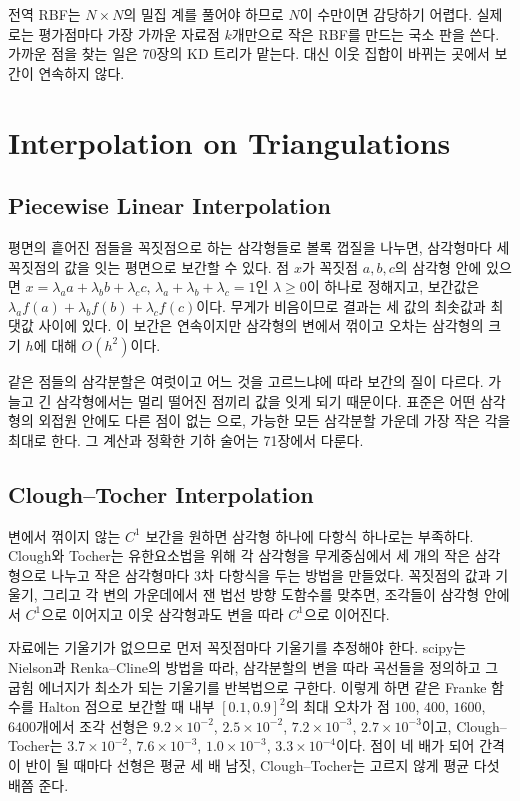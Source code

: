 전역 RBF는 $N\times N$의 밀집 계를 풀어야 하므로 $N$이 수만이면 감당하기 어렵다. 실제로는 평가점마다 가장 가까운 자료점 $k$개만으로 작은 RBF를 만드는 국소 판을 쓴다. 가까운 점을 찾는 일은 70장의 KD 트리가 맡는다. 대신 이웃 집합이 바뀌는 곳에서 보간이 연속하지 않다.

\section{Interpolation on Triangulations}
\label{sec:triangulation-interp}

\subsection{Piecewise Linear Interpolation}

평면의 흩어진 점들을 꼭짓점으로 하는 삼각형들로 볼록 껍질을 나누면, 삼각형마다 세 꼭짓점의 값을 잇는 평면으로 보간할 수 있다. 점 $x$가 꼭짓점 $a,b,c$의 삼각형 안에 있으면 $x=\lambda_aa+\lambda_bb+\lambda_cc$, $\lambda_a+\lambda_b+\lambda_c=1$인  $\lambda\ge0$이 하나로 정해지고, 보간값은 $\lambda_af(a)+\lambda_bf(b)+\lambda_cf(c)$이다. 무게가 비음이므로 결과는 세 값의 최솟값과 최댓값 사이에 있다. 이 보간은 연속이지만 삼각형의 변에서 꺾이고 오차는 삼각형의 크기 $h$에 대해 $O(h^2)$이다.

같은 점들의 삼각분할은 여럿이고 어느 것을 고르느냐에 따라 보간의 질이 다르다. 가늘고 긴 삼각형에서는 멀리 떨어진 점끼리 값을 잇게 되기 때문이다. 표준은 어떤 삼각형의 외접원 안에도 다른 점이 없는 으로, 가능한 모든 삼각분할 가운데 가장 작은 각을 최대로 한다\cite{sibson1978}. 그 계산과 정확한 기하 술어는 71장에서 다룬다.

\subsection{Clough--Tocher Interpolation}

변에서 꺾이지 않는 $C^1$ 보간을 원하면 삼각형 하나에 다항식 하나로는 부족하다. Clough와 Tocher는 유한요소법을 위해 각 삼각형을 무게중심에서 세 개의 작은 삼각형으로 나누고 작은 삼각형마다 3차 다항식을 두는 방법을 만들었다\cite{clough1965}. 꼭짓점의 값과 기울기, 그리고 각 변의 가운데에서 잰 법선 방향 도함수를 맞추면, 조각들이 삼각형 안에서 $C^1$으로 이어지고 이웃 삼각형과도 변을 따라 $C^1$으로 이어진다.

자료에는 기울기가 없으므로 먼저 꼭짓점마다 기울기를 추정해야 한다. scipy는 Nielson과 Renka--Cline의 방법을 따라, 삼각분할의 변을 따라 곡선들을 정의하고 그 굽힘 에너지가 최소가 되는 기울기를 반복법으로 구한다\cite{nielson1983,renka1984}. 이렇게 하면 같은 Franke 함수를 Halton 점으로 보간할 때 내부 $[0.1,0.9]^2$의 최대 오차가 점 $100$, $400$, $1600$, $6400$개에서 조각 선형은 $9.2\times10^{-2}$, $2.5\times10^{-2}$, $7.2\times10^{-3}$, $2.7\times10^{-3}$이고, Clough--Tocher는 $3.7\times10^{-2}$, $7.6\times10^{-3}$, $1.0\times10^{-3}$, $3.3\times10^{-4}$이다. 점이 네 배가 되어 간격이 반이 될 때마다 선형은 평균 세 배 남짓, Clough--Tocher는 고르지 않게 평균 다섯 배쯤 준다.

